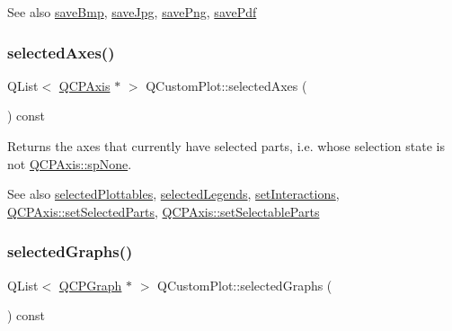 \begin{DoxySeeAlso}{See also}
\hyperlink{class_q_custom_plot_a6629d9e8e6da4bf18055ee0257fdce9a}{save\+Bmp}, \hyperlink{class_q_custom_plot_a490c722092d1771e8ce4a7a73dfd84ab}{save\+Jpg}, \hyperlink{class_q_custom_plot_a7636261aff1f6d25c9da749ece3fc8b8}{save\+Png}, \hyperlink{class_q_custom_plot_a632da44c6d94ea8b271eb483b08b5114}{save\+Pdf} 
\end{DoxySeeAlso}
\hypertarget{class_q_custom_plot_a7e6b07792b1cb2c31681596582d14dbe}{}\label{class_q_custom_plot_a7e6b07792b1cb2c31681596582d14dbe} 
\subsubsection{\texorpdfstring{selected\+Axes()}{selectedAxes()}}
{\footnotesize\ttfamily Q\+List$<$ \hyperlink{class_q_c_p_axis}{Q\+C\+P\+Axis} $\ast$ $>$ Q\+Custom\+Plot\+::selected\+Axes (\begin{DoxyParamCaption}{ }\end{DoxyParamCaption}) const}

Returns the axes that currently have selected parts, i.\+e. whose selection state is not \hyperlink{class_q_c_p_axis_abee4c7a54c468b1385dfce2c898b115fae0df8123a5528d5ccf87cb7794f971ea}{Q\+C\+P\+Axis\+::sp\+None}.

\begin{DoxySeeAlso}{See also}
\hyperlink{class_q_custom_plot_a747faaab57c56891e901a1e97fa4359a}{selected\+Plottables}, \hyperlink{class_q_custom_plot_ac87624ddff1cbf4064781a8e8ae321c4}{selected\+Legends}, \hyperlink{class_q_custom_plot_a5ee1e2f6ae27419deca53e75907c27e5}{set\+Interactions}, \hyperlink{class_q_c_p_axis_ab9d7a69277dcbed9119b3c1f25ca19c3}{Q\+C\+P\+Axis\+::set\+Selected\+Parts}, \hyperlink{class_q_c_p_axis_a513f9b9e326c505d9bec54880031b085}{Q\+C\+P\+Axis\+::set\+Selectable\+Parts} 
\end{DoxySeeAlso}
\hypertarget{class_q_custom_plot_ad3547aded026d8a9ae6ef13a69080d06}{}\label{class_q_custom_plot_ad3547aded026d8a9ae6ef13a69080d06} 
\subsubsection{\texorpdfstring{selected\+Graphs()}{selectedGraphs()}}
{\footnotesize\ttfamily Q\+List$<$ \hyperlink{class_q_c_p_graph}{Q\+C\+P\+Graph} $\ast$ $>$ Q\+Custom\+Plot\+::selected\+Graphs (\begin{DoxyParamCaption}{ }\end{DoxyParamCaption}) const}

